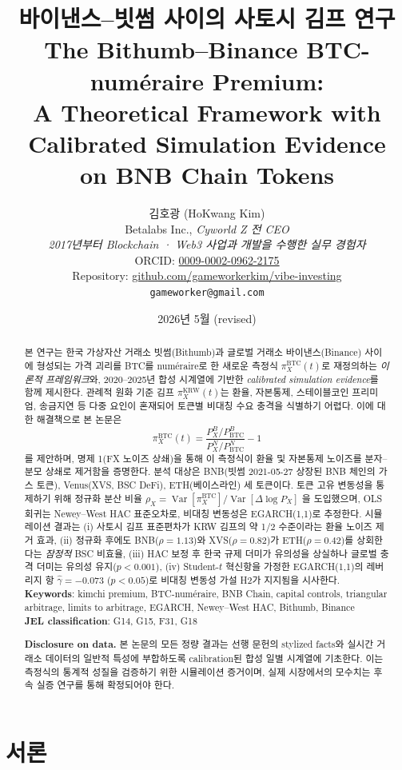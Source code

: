 \documentclass[11pt,a4paper]{article}
\title{\textbf{바이낸스--빗썸 사이의 사토시 김프 연구}\\[6pt]
       \large The Bithumb--Binance BTC-num\'eraire Premium:\\
       A Theoretical Framework with Calibrated Simulation Evidence\\
       on BNB Chain Tokens}
\author{김호광 (HoKwang Kim)\\
        \small Betalabs Inc., \emph{Cyworld Z 전 CEO}\\
        \small \emph{2017년부터 Blockchain · Web3 사업과 개발을 수행한 실무 경험자}\\
        \small ORCID: \href{https://orcid.org/0009-0002-0962-2175}{0009-0002-0962-2175}\\
        \small Repository: \href{https://github.com/gameworkerkim/vibe-investing}{github.com/gameworkerkim/vibe-investing}\\
        \small \texttt{gameworker@gmail.com}}
\date{2026년 5월 (revised)}
\begin{document}
\maketitle

\begin{abstract}
\noindent 본 연구는 한국 가상자산 거래소 빗썸(Bithumb)과 글로벌 거래소 바이낸스(Binance) 사이에
형성되는 가격 괴리를 BTC를 num\'eraire로 한 새로운 측정식 $\pi^{\text{BTC}}_X(t)$로 재정의하는
\emph{이론적 프레임워크}와, 2020--2025년 합성 시계열에 기반한 \emph{calibrated simulation evidence}를
함께 제시한다. 관례적 원화 기준 김프 $\pi^{\text{KRW}}_X(t)$는 환율, 자본통제, 스테이블코인 프리미엄,
송금지연 등 다중 요인이 혼재되어 토큰별 비대칭 수요 충격을 식별하기 어렵다. 이에 대한 해결책으로 본 논문은
\[
   \pi^{\text{BTC}}_X(t)=\frac{P_X^B/P_{\mathrm{BTC}}^B}{P_X^N/P_{\mathrm{BTC}}^N}-1
\]
를 제안하며, 명제 1(FX 노이즈 상쇄)을 통해 이 측정식이 환율 및 자본통제 노이즈를 분자--분모 상쇄로
제거함을 증명한다. 분석 대상은 BNB(빗썸 2021-05-27 상장된 BNB 체인의 가스 토큰), Venus(XVS, BSC DeFi),
ETH(베이스라인) 세 토큰이다. 토큰 고유 변동성을 통제하기 위해 정규화 분산 비율
$\rho_X=\operatorname{Var}[\pi^{\text{BTC}}_X]/\operatorname{Var}[\Delta\log P_X]$
을 도입했으며, OLS 회귀는 Newey--West HAC 표준오차로, 비대칭 변동성은 EGARCH(1,1)로 추정한다.
시뮬레이션 결과는 (i) 사토시 김프 표준편차가 KRW 김프의 약 1/2 수준이라는 환율 노이즈 제거 효과,
(ii) 정규화 후에도 BNB($\rho=1.13$)와 XVS($\rho=0.82$)가 ETH($\rho=0.42$)를 상회한다는 \emph{잠정적} BSC 비효율,
(iii) HAC 보정 후 한국 규제 더미가 유의성을 상실하나 글로벌 충격 더미는 유의성 유지($p<0.001$),
(iv) Student-$t$ 혁신항을 가정한 EGARCH(1,1)의 레버리지 항 $\hat\gamma=-0.073$ ($p<0.05$)로 비대칭 변동성 가설 H2가 지지됨을 시사한다.
\\[4pt]
\textbf{Keywords}: kimchi premium, BTC-num\'eraire, BNB Chain, capital controls, triangular arbitrage,
limits to arbitrage, EGARCH, Newey--West HAC, Bithumb, Binance\\
\textbf{JEL classification}: G14, G15, F31, G18

\medskip
\noindent\textbf{Disclosure on data.} 본 논문의 모든 정량 결과는 선행 문헌의 stylized facts와 실시간 거래소 데이터의 일반적 특성에 부합하도록 calibration된 합성 일별 시계열에 기초한다. 이는 측정식의 통계적 성질을 검증하기 위한 시뮬레이션 증거이며, 실제 시장에서의 모수치는 후속 실증 연구를 통해 확정되어야 한다.
\end{abstract}

\section{서론}
\end{document}
